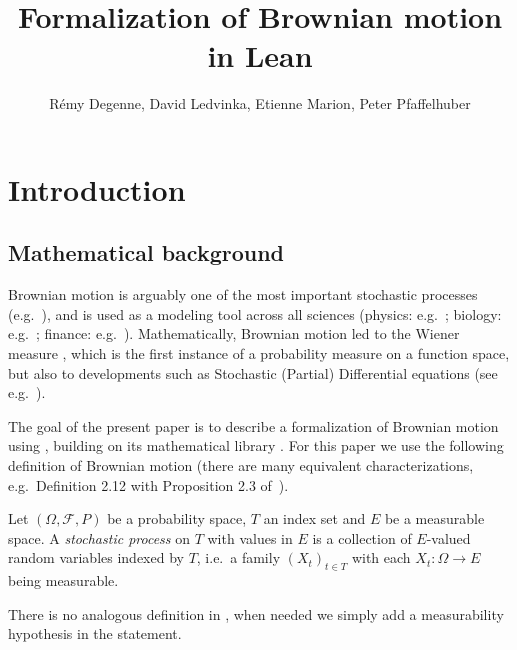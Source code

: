 \documentclass[lean]{Draft}
\title[Formalization of Brownian motion in Lean]{Formalization of Brownian motion in Lean}
\author[R. Degenne, D. Ledvinka, E. Marion, P. Pfaffelhuber]{
  Rémy Degenne, David Ledvinka, Etienne Marion, Peter Pfaffelhuber}
\makeatletter
\newcommand\leanlink{\begingroup\catcode`\#=12\relax\@leanlink}
\newcommand\@leanlink[2]{\endgroup
\href{#1}
{\texttt{\detokenize{#2}}}}
\makeatother
\begin{document}



\section{Introduction}

\subsection{Mathematical background}
\sloppy Brownian motion is arguably one of the most important stochastic processes (e.g.\ \cite{karatzas1991brownian, revuz1999continuous, morters2010brownian}), and is used as a modeling tool across all sciences (physics: e.g.\ \cite{einstein1906theorie, bian2016111}; biology: e.g.\ \cite{erban2014molecular}; finance: e.g.\ \cite{davis2006louis}). Mathematically, Brownian motion led to the Wiener measure \cite{wiener1923differential}, which is the first instance of a probability measure on a function space, but also to developments such as Stochastic (Partial) Differential equations (see e.g.\ \cite{hairer2009introduction}).

The goal of the present paper is to describe a formalization of Brownian motion using \Lean \cite{lean, moura2021lean}, building on its mathematical library \mathlib \cite{mathlib}. For this paper we use the following definition of Brownian motion (there are many equivalent characterizations, e.g.\ Definition 2.12 with Proposition 2.3 of~\cite{LeGall2016}).

\begin{definition}\label{def:stochastic_process}
  Let $(\Omega, \mathcal{F}, P)$ be a probability space, $T$ an index set and $E$ be a measurable space. A \emph{stochastic process} on $T$ with values in $E$ is a collection of $E$-valued random variables indexed by $T$, i.e.\ a family $(X_t)_{t \in T}$ with each $X_t : \Omega \to E$ being measurable.

  There is no analogous definition in \mathlib, when needed we simply add a measurability hypothesis in the statement.
\end{definition}
\end{document}
